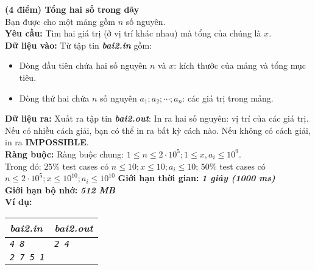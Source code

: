 \begin{ex}
	\textbf{(4 điểm) Tổng hai số trong dãy}\\
	Bạn được cho một mảng gồm $n$ số nguyên. \\
	\textbf{Yêu cầu: } Tìm hai giá trị (ở vị trí khác nhau) mà tổng của chúng là $x$.\\
	\textbf{Dữ liệu vào: } Từ tập tin \textbf{\textit{bai2.in}} gồm: 
	\begin{itemize}
		\item Dòng đầu tiên chứa hai số nguyên $n$ và $x$: kích thước của mảng và tổng mục tiêu. 
		\item Dòng thứ hai chứa $n$ số nguyên $a_1; a_2; \cdots; a_n$: các giá trị trong mảng. 
	\end{itemize}
	\textbf{Dữ liệu ra: } Xuất ra tập tin \textbf{\textit{bai2.out}}: 
	In ra hai số nguyên: vị trí của các giá trị. Nếu có nhiều cách giải, bạn có thể in ra bất kỳ cách nào. Nếu không có cách giải, in ra \textbf{IMPOSSIBLE}. \\
	\textbf{Ràng buộc: } Ràng buộc chung: $1 \leq n \leq 2 \cdot 10^5; 1 \leq x , a_i \leq 10^9$. \\
	Trong đó: $25\%$ test cases có $n \leq 10; x \leq 10; a_i \leq 10$; $50\%$ test cases có $n \leq 2\cdot 10^5; x \leq 10^{10}; a_i \leq 10^{10} $
	\textbf{Giới hạn thời gian: } \textbf{\textit{1 giây (1000 ms)}} \\
	\textbf{Giới hạn bộ nhớ: } \textbf{\textit{512 MB}}\\
	\textbf{Ví dụ: }
	\begin{center}
		\begin{tabular}{|l|l|}
			\hline
			\textbf{\textsf{\textit{bai2.in}}} & \textbf{\textsf{\textit{bai2.out}}} \\ %
			\hline
			\textit{\texttt{4 8}} & \textit{\texttt{2 4}} \\ %
			\textit{\texttt{2 7 5 1}} &  \\ %
			\hline
		\end{tabular}
	\end{center}
\end{ex}

